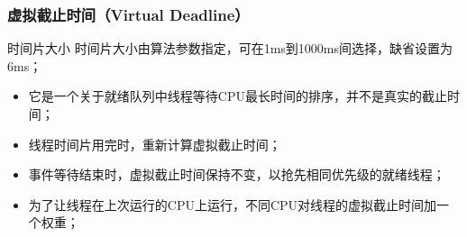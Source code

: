 \begin{frame}[fragile]
    \frametitle{虚拟截止时间（Virtual Deadline）}
    \begin{block}{时间片大小}
    时间片大小由算法参数指定，可在1ms到1000ms间选择，缺省设置为6ms；
    \end{block} \pause

    \begin{itemize}
        \item 它是一个关于就绪队列中线程等待CPU最长时间的排序，并不是真实的截止时间； \pause
        \item 线程时间片用完时，重新计算虚拟截止时间；
        \item 事件等待结束时，虚拟截止时间保持不变，以抢先相同优先级的就绪线程； \pause
        \item 为了让线程在上次运行的CPU上运行，不同CPU对线程的虚拟截止时间加一个权重；
    \end{itemize}

\end{frame}

